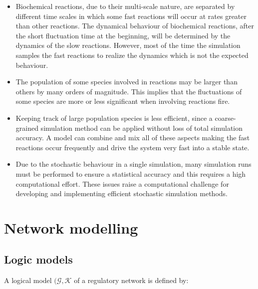  \begin{itemize}
    \item Biochemical reactions, due to their multi-scale nature, are separated by different time scales in which some fast reactions will occur at rates greater than other reactions.
      The dynamical behaviour of biochemical reactions, after the short fluctuation time at the beginning, will be determined by the dynamics of the slow reactions.
      However, most of the time the simulation samples the fast reactions to realize the dynamics which is not the expected behaviour.
    \item The population of some species involved in reactions may be larger than others by many orders of magnitude.
      This implies that the fluctuations of some species are more or less significant when involving reactions fire.
    \item Keeping track of large population species is less efficient, since a coarse-grained simulation method can be applied without loss of total simulation accuracy.
      A model can combine and mix all of these aspects making the fast reactions occur frequently and drive the system very fast into a stable state.
    \item Due to the stochastic behaviour in a single simulation, many simulation runs must be performed to ensure a statistical accuracy and this requires a high computational effort.
      These issues raise a computational challenge for developing and implementing efficient stochastic simulation methods.
  \end{itemize}

\section{Network modelling}

  \subsection{Logic models}
  A logical model $(\mathcal{G}, \mathcal{K}$ of a regulatory network is defined by:

